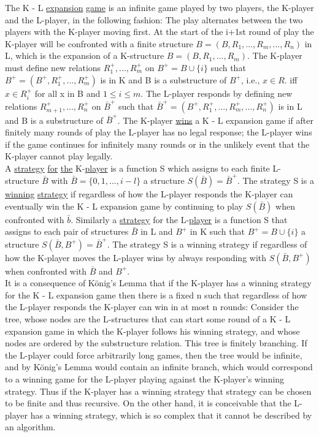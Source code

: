 \documentclass[twoside]{article}
\begin{document}
The   K - L   \underline{expansion} \underline{game} is an infinite game played by two players, the K-player and the   L-player,  in the following fashion:    The play alternates between the two players with the   K-player moving first. 
At the start of the i+1st round of play    the K-player will be confronted with a finite structure $B = (B, R_1,...,R_m,...,R_n)$    in   L, which is the expansion of a K-structure $B = (B,R_1,..., R_m)$.    
The   K-player must define new relations $R_1^{+},...,R_m^+$     on $B^+ = B \cup \{i\}$   such that   $B^+ = (B^+, R_1^+,...,R_m^+)$ is in   K   and   B   is a substructure of $B^+$, i.e., $x\in R$. iff $x\in R_i^+$ for all x in B and $1 \leq i \leq m$. 
The L-player responds by defining new relations   $R_{m+1}^+,...,R_n^+$ on   $\bar{B}^+$   such that   $\bar{B}^+ = (B^+,R_1^+,...,R_m^+,...,R_n^+)$    is   in   L   and   B is a substructure of   $\bar{B}^+$.   
The K-player \underline{wins} a   K - L   expansion game if after finitely many rounds of play the L-player has no legal response;  the L-player wins if the game continues for infinitely many rounds or in the unlikely event that the   K-player cannot play legally.\\
\indent A \underline{strategy} \underline{for} \underline{the}   K-\underline{player} is a function   S which assigns to each finite L-structure $\bar{B}$ with $\bar{B} = \{0,1,...,i-l\}$ a structure   $S(\bar{B}) = \bar{B}^+$. 
The strategy S is a \underline{winning} \underline{strategy} if regardless of how the   L-player responds the K-player can eventually win the   K - L   expansion game by continuing to play $S(\bar{B})$ when confronted with   $\bar{b}$.
Similarly a \underline{strategy} for the   L-\underline{player}   is a function   S   that assigns to each pair of structures  $\bar{B}$   in   L and   $B^+$   in K such that   $B^+ = B \cup \{i\}$   a structure   $S(\bar{B},B^+) = \bar{B}^+$.   The strategy   S   is a winning strategy if regardless of how the   K-player moves the L-player wins by always responding with   $S(\bar{B},B^+)$   when confronted with   $\bar{B}$   and $B^+$.\\
\indent It is a consequence of K\"{o}nig's Lemma   that if the   K-player has a
winning strategy for the   K - L   expansion game then there is a fixed   n such that regardless of how the   L-player responds the   K-player can win in at most n   rounds:   Consider the tree, whose nodes are the   L-structures that can start some round of a   K - L   expansion game in which the K-player follows his winning strategy, and whose nodes are ordered by the substructure relation.
This tree is finitely branching.    If the   L-player could force arbitrarily long games, then the tree would be infinite, and by K\"{o}nig's Lemma would contain an infinite branch, which would correspond to a winning game for the
\newpage
\noindent L-player playing against the   K-player's winning strategy.    
Thus if the K-player has a winning strategy that strategy can be chosen to be finite and thus recursive.    
On the other hand, it is conceivable that the L-player has a winning strategy, which is so complex that it cannot be described by an algorithm.
\end{document}
